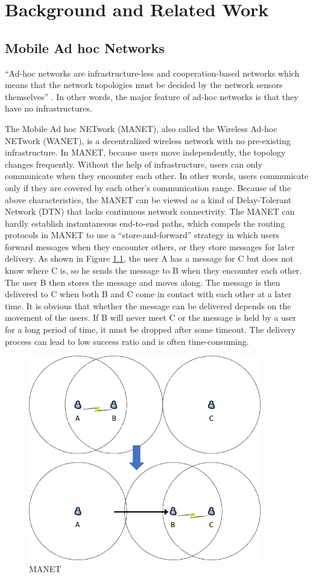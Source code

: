 \chapter {Background and Related Work}
\label{BRW}
\section{ Mobile Ad hoc Networks}
\noindent ``Ad-hoc networks are infrastructure-less and cooperation-based networks which means that the network topologies must be decided by the network sensors themselves'' \cite {C14}. In other words, the major feature of ad-hoc networks is that they have no infrastructures.

The Mobile Ad hoc NETwork (MANET), also called the Wireless Ad-hoc NETwork (WANET), is a decentralized wireless network with no pre-existing infrastructure. In MANET, because users move independently, the topology changes frequently. Without the help of infrastructure, users can only communicate when they encounter each other. In other words, users communicate only if they are covered by each other's communication range. Because of the above characteristics, the MANET can be viewed as a kind of Delay-Tolerant Network (DTN) that lacks continuous network connectivity. The MANET can hardly establish instantaneous end-to-end paths, which compels the routing protocols in MANET to use a ``store-and-forward'' strategy in which users forward messages when they encounter others, or they store messages for later delivery. As shown in Figure \ref{fig:MANET}, the user A has a message for C but does not know where C is, so he sends the message to B when they encounter each other. The user B then stores the message and moves along. The message is then delivered to C when both B and C come in contact with each other at a later time. It is obvious that whether the message can be delivered depends on the movement of the users. If B will never meet C or the message is held by a user for a long period of time, it must be dropped after some timeout. The delivery process can lead to low success ratio and is often time-consuming.

\begin{figure} [H]
  \centering 
  \includegraphics[width=4.0in]{figures/FIG_MANET.png}
  \caption{MANET} 
  \label{fig:MANET} %
\end{figure}

